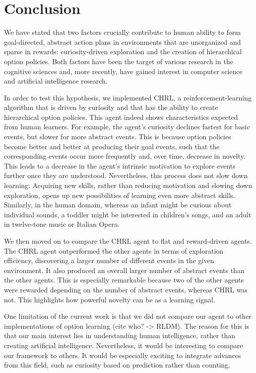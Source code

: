 \documentclass{article}
\begin{document}
\section{Conclusion}

We have stated that two factors crucially contribute to human ability to form goal-directed, abstract action plans in environments that are unorganized and sparse in rewards: curiosity-driven exploration and the creation of hierarchical option policies. Both factors have been the target of various research in the cognitive sciences and, more recently, have gained interest in computer science and artificial intelligence research.

In order to test this hypothesis, we implemented CHRL, a reinforcement-learning algorithm that is driven by curiosity and that has the ability to create hierarchical option policies. This agent indeed shows characteristics expected from human learners. For example, the agent's curiosity declines fastest for basic events, but slower for more abstract events. This is because option policies become better and better at producing their goal events, such that the corresponding events occur more frequently and, over time, decrease in novelty. This leads to a decrease in the agent's intrinsic motivation to explore events further once they are understood. Nevertheless, this process does not slow down learning: Acquiring new skills, rather than reducing motivation and slowing down exploration, opens up new possibilities of learning even more abstract skills. Similarly, in the human domain, whereas an infant might be curious about individual sounds, a toddler might be interested in children's songs, and an adult in twelve-tone music or Italian Opera. 

We then moved on to compare the CHRL agent to flat and reward-driven agents. The CHRL agent outperformed the other agents in terms of exploration efficiency, discovering a larger number of different events in the given environment. It also produced an overall larger number of abstract events than the other agents. This is especially remarkable because two of the other agents were rewarded depending on the number of abstract events, whereas CHRL was not. This highlights how powerful novelty can be as a learning signal.

One limitation of the current work is that we did not compare our agent to other implementations of option learning (cite who? -> RLDM). The reason for this is that our main interest lies in understanding human intelligence, rather than creating artificial intelligence. Nevertheless, it would be interesting to compare our framework to others. It would be especially exciting to integrate advances from this field, such as curiosity based on prediction rather than counting. 
\end{document}
